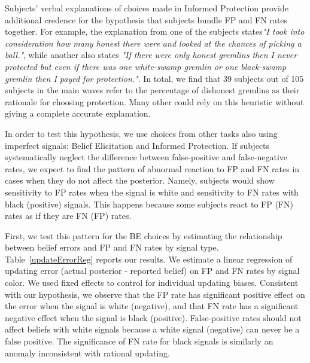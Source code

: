 \documentclass[12pt,a4paper]{article}
\begin{document}
Subjects' verbal explanations of choices made in Informed Protection provide additional credence for the hypothesis that subjects bundle FP and FN rates together. For example, the explanation from one of the subjects states\textit{"I took into consideration how many honest there were and looked at the chances of picking a ball."}, while another also states \textit{"If there were only honest gremlins then I never protected but even if there was one white-swamp gremlin or one black-swamp gremlin then I payed for protection."}. In total, we find that 39 subjects out of 105 subjects in the main waves refer to the percentage of dishonest gremlins as their rationale for choosing protection. Many other could rely on this heuristic without giving a complete accurate explanation.


In order to test this hypothesis, we use choices from other tasks also using imperfect signals: Belief Elicitation and Informed Protection. If subjects systematically neglect the difference between false-positive and false-negative rates, we expect to find the pattern of abnormal reaction to FP and FN rates in cases when they do not affect the posterior. Namely, subjects would show sensitivity to FP rates when the signal is white and sensitivity to FN rates with black (positive) signals. This happens because some subjects react to FP (FN) rates as if they are FN (FP) rates.

First, we test this pattern for the BE choices by estimating the relationship between belief errors and FP and FN rates by signal type. Table~\ref{updateErrorReg} reports our results. We estimate a linear regression of updating error (actual posterior - reported belief) on FP and FN rates by signal color. We used fixed effects to control for individual updating biases. Consistent with our hypothesis, we observe that the FP rate has significant positive effect on the error when the signal is white (negative), and that FN rate has a significant negative effect when the signal is black (positive). False-positive rates should not affect beliefs with white signals because a white signal (negative) can never be a false positive. The significance of FN rate for black signals is similarly an anomaly inconsistent with rational updating. 

\end{document}
